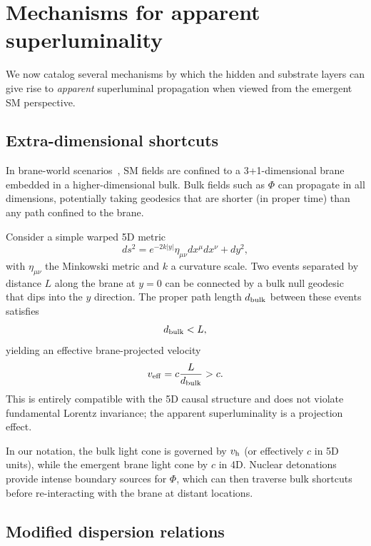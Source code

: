 \documentclass[aps,prd,twocolumn,nofootinbib,superscriptaddress]{revtex4-2}
\begin{document}
\section{Mechanisms for apparent superluminality}
\label{sec:superluminal}

We now catalog several mechanisms by which the hidden and substrate layers can give rise to \emph{apparent} superluminal propagation when viewed from the emergent SM perspective.

\subsection{Extra-dimensional shortcuts}
\label{subsec:shortcuts}

In brane-world scenarios~\cite{ADD,RS1}, SM fields are confined to a 3+1-dimensional brane embedded in a higher-dimensional bulk. Bulk fields such as $\Phi$ can propagate in all dimensions, potentially taking geodesics that are shorter (in proper time) than any path confined to the brane.

Consider a simple warped 5D metric
\begin{equation}
    ds^2 = e^{-2k|y|} \eta_{\mu\nu} dx^\mu dx^\nu + dy^2,
\end{equation}
with $\eta_{\mu\nu}$ the Minkowski metric and $k$ a curvature scale. Two events separated by distance $L$ along the brane at $y = 0$ can be connected by a bulk null geodesic that dips into the $y$ direction. The proper path length $d_{\rm bulk}$ between these events satisfies
\begin{equation}
    d_{\rm bulk} < L,
\end{equation}
yielding an effective brane-projected velocity
\begin{equation}
    v_{\rm eff} = c \frac{L}{d_{\rm bulk}} > c.
\end{equation}
This is entirely compatible with the 5D causal structure and does not violate fundamental Lorentz invariance; the apparent superluminality is a projection effect.

In our notation, the bulk light cone is governed by $v_{\rm h}$ (or effectively $c$ in 5D units), while the emergent brane light cone by $c$ in 4D. Nuclear detonations provide intense boundary sources for $\Phi$, which can then traverse bulk shortcuts before re-interacting with the brane at distant locations.

\subsection{Modified dispersion relations}
\label{subsec:mdr}
\end{document}
